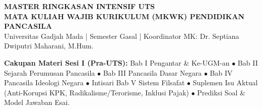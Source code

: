 \documentclass[10pt,a4paper]{article}
\begin{document}
\begin{tcolorbox}[
  enhanced,
  colback=ugmblue,
  colframe=ugmgold,
  arc=4mm,
  boxrule=1.5pt,
  top=5mm, bottom=5mm, left=6mm, right=6mm
]
\begin{center}
  {\color{ugmgold}\Huge\textbf{MASTER RINGKASAN INTENSIF UTS}}\\[2mm]
  {\color{white}\Large\textbf{MATA KULIAH WAJIB KURIKULUM (MKWK) PENDIDIKAN PANCASILA}}\\[1.5mm]
  {\color{white!90}\small Universitas Gadjah Mada | Semester Gasal | Koordinator MK: Dr. Septiana Dwiputri Maharani, M.Hum.}
\end{center}
\vspace{-1mm}
\tcbline
\vspace{-1mm}
{\color{white}\footnotesize
\textbf{Cakupan Materi Sesi I (Pra-UTS):} Bab I Pengantar \& Ke-UGM-an $\bullet$ Bab II Sejarah Perumusan Pancasila $\bullet$ Bab III Pancasila Dasar Negara $\bullet$ Bab IV Pancasila Ideologi Negara $\bullet$ Intisari Bab V Sistem Filsafat $\bullet$ Suplemen Isu Aktual (Anti-Korupsi KPK, Radikalisme/Terorisme, Inklusi Pajak) $\bullet$ Prediksi Soal \& Model Jawaban Esai.}
\end{tcolorbox}

\vspace{2mm}
\end{document}
